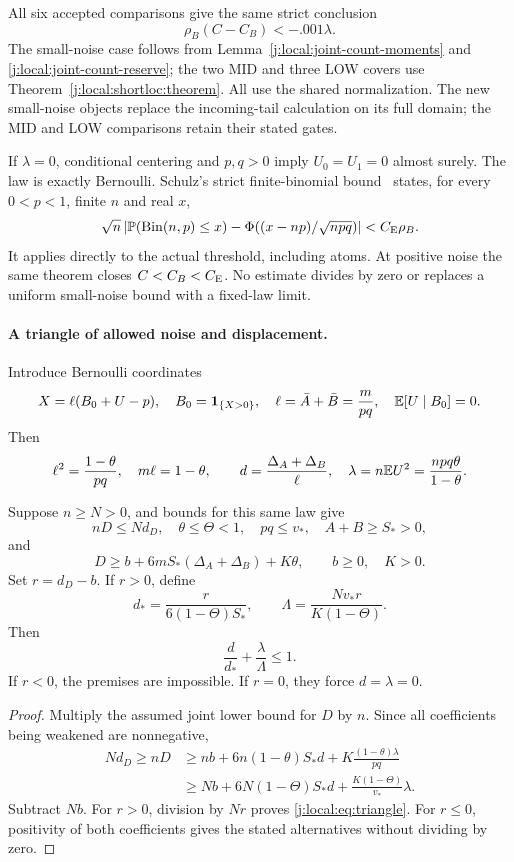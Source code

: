 All six accepted comparisons give the same strict conclusion
\[
                        \rho_B(C-C_B)<-.001\lambda.
\]
The small-noise case follows from Lemma~\ref{j:local:joint-count-moments}
and \eqref{j:local:joint-count-reserve}; the two MID and three LOW covers
use Theorem~\ref{j:local:shortloc:theorem}. All use the shared normalization.
The new small-noise objects replace the incoming-tail calculation on its
full domain; the MID and LOW comparisons retain their stated gates.

If $\lambda=0$, conditional centering and $p,q>0$ imply $U_0=U_1=0$
almost surely. The law is exactly Bernoulli. Schulz's strict finite-binomial
bound~\cite[Theorem~1]{Schulz2016} states, for every $0<p<1$, finite $n$
and real $x$,
\[
 \sqrt n\left|\mathbb P(\operatorname{Bin}(n,p)\le x)
 -\Phi((x-np)/\sqrt{npq})\right|<C_{\mathrm E}\rho_B.
\]
It applies directly to the actual threshold, including atoms. At positive
noise the same theorem closes $C<C_B<C_{\mathrm E}$. No estimate divides by zero
or replaces a uniform small-noise bound with a fixed-law limit.

\paragraph{A triangle of allowed noise and displacement.}
Introduce Bernoulli coordinates
\[
 X=\ell(B_0+U-p),\quad B_0=\mathbf1_{\{X>0\}},\quad
 \ell=\bar A+\bar B=\frac m{pq},\quad \mathbb E[U\mid B_0]=0.
\]
Then
\[
 \ell^2=\frac{1-\theta}{pq},\quad m\ell=1-\theta,
 \qquad d=\frac{\Delta_A+\Delta_B}{\ell},\quad
 \lambda=n\mathbb E U^2=\frac{npq\theta}{1-\theta}.
\]

\begin{theorem}\label{j:local:triangle}
Suppose $n\ge N>0$, and bounds for this same law give
\[
 nD\le N d_D,\quad \theta\le\Theta<1,\quad pq\le v_*,
 \quad A+B\ge S_*>0,
\]
and
\[
 D\ge b+6mS_*(\Delta_A+\Delta_B)+K\theta,
 \qquad b\ge0,\quad K>0.
\]
Set $r=d_D-b$. If $r>0$, define
\[
 d_* =\frac{r}{6(1-\Theta)S_*},\qquad
 \Lambda=\frac{Nv_*r}{K(1-\Theta)}.
\]
Then
\begin{equation}\label{j:local:eq:triangle}
                 \boxed{\displaystyle
                   \frac d{d_*}+\frac\lambda\Lambda\le1.}
\end{equation}
If $r<0$, the premises are impossible. If $r=0$, they force
$d=\lambda=0$.
\end{theorem}
\begin{proof}
Multiply the assumed joint lower bound for $D$ by $n$. Since all
coefficients being weakened are nonnegative,
\begin{align*}
 Nd_D\ge nD
 &\ge nb+6n(1-\theta)S_*d+K\frac{(1-\theta)\lambda}{pq}\\
 &\ge Nb+6N(1-\Theta)S_*d+\frac{K(1-\Theta)}{v_*}\lambda.
\end{align*}
Subtract $Nb$. For $r>0$, division by $Nr$ proves
\eqref{j:local:eq:triangle}. For $r\le0$, positivity of both coefficients gives
the stated alternatives without dividing by zero.
\end{proof}


